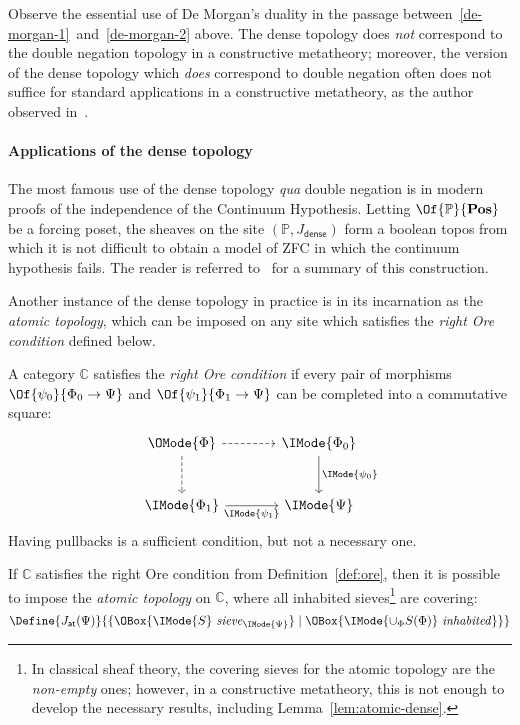 \documentclass{article}
\newcommand\Posets{\mathbf{Pos}}
\newcommand\IsSieve[2]{\IMode{#2}\ \mathit{sieve}_{\IMode{#1}}}
\newcommand\JAtomic{J_{\mathsf{at}}}
\newcommand\JDense{J_{\mathsf{dense}}}
\newcommand\IsInh[1]{\IMode{#1}\ \mathit{inhabited}}
\newcommand\MkSet[1]{\{#1\}}
\begin{document}
\begin{remark}
  Observe the essential use of De Morgan's duality in the passage
  between~\ref{de-morgan-1}~and~\ref{de-morgan-2} above. The dense
  topology does \emph{not} correspond to the double negation topology
  in a constructive metatheory; moreover, the version of the dense
  topology which \emph{does} correspond to double negation often does
  not suffice for standard applications in a constructive metatheory,
  as the author observed
  in~\cite{sterling:math-stack-exchange-dense-topology}.
\end{remark}

\paragraph{Applications of the dense topology}
The most famous use of the dense topology \emph{qua} double negation
is in modern proofs of the independence of the Continuum
Hypothesis. Letting $\Of{\mathbb{P}}{\Posets}$ be a forcing poset, the
sheaves on the site $(\mathbb{P},\JDense)$ form a boolean topos from
which it is not difficult to obtain a model of ZFC in which the
continuum hypothesis fails. The reader is referred
to~\cite{maclane-moerdijk:1992} for a summary of this construction.

Another instance of the dense topology in practice is in its
incarnation as the \emph{atomic topology}, which can be imposed on any
site which satisfies the \emph{right Ore condition} defined below.

\begin{definition}\label{def:ore}
  A category $\mathbb{C}$ satisfies the \emph{right Ore condition} if
  every pair of morphisms
  $\Of{\psi_0}{\Phi_0\to\Psi}$ and
  $\Of{\psi_1}{\Phi_1\to\Psi}$ can be completed into
  a commutative square:
  \[
    \begin{tikzcd}[sep=large]
      \OMode{\Phi}
      \arrow[r,dashed]
      \arrow[d,dashed]
      &
      \IMode{\Phi_0}
      \arrow[d,"\IMode{\psi_0}"]
      \\
      \IMode{\Phi_1}
      \arrow[r,swap,"\IMode{\psi_1}"]
      &
      \IMode{\Psi}
    \end{tikzcd}
  \]
  Having pullbacks is a sufficient condition, but not a necessary one.
\end{definition}

\begin{definition}
  If $\mathbb{C}$ satisfies the right Ore condition from
  Definition~\ref{def:ore}, then it is possible to impose the
  \emph{atomic topology} on $\mathbb{C}$, where all inhabited
  sieves\footnote{In classical sheaf theory, the covering sieves for
    the atomic topology are the \emph{non-empty} ones; however, in a
    constructive metatheory, this is not enough to develop the
    necessary results, including Lemma~\ref{lem:atomic-dense}.}  are
  covering:
  \[
    \Define{
      \JAtomic(\Psi)
    }{
      \MkSet{
        \OBox{\IsSieve{\Psi}{S}}
        \mid
        \OBox{\IsInh{\cup_\Phi S(\Phi)}}
      }
    }
  \]
\end{definition}
\end{document}
